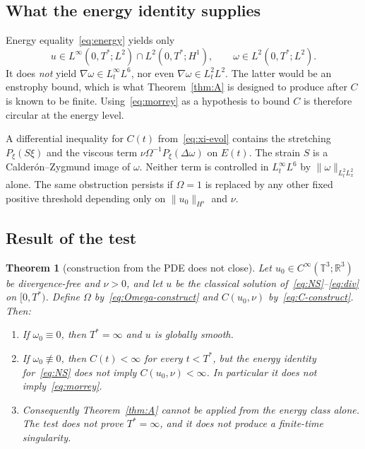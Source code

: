 \documentclass[11pt,a4paper]{article}
\newtheorem{theorem}{Theorem}
\theoremstyle{definition}
\theoremstyle{remark}
\newcommand{\R}{\mathbb{R}}
\newcommand{\T}{\mathbb{T}}
\newcommand{\norm}[1]{\lVert#1\rVert}
\begin{document}
\subsection{What the energy identity supplies}

Energy equality~\eqref{eq:energy} yields only
\[
u\in L^\infty(0,T^*;L^2)\cap L^2(0,T^*;H^1),
\qquad
\omega\in L^2(0,T^*;L^2).
\]
It does \emph{not} yield \(\nabla\omega\in L^\infty_t L^6\), nor even
\(\nabla\omega\in L^2_t L^2\). The latter would be an enstrophy bound,
which is what Theorem~\ref{thm:A} is designed to produce after \(C\) is
known to be finite. Using~\eqref{eq:morrey} as a hypothesis to bound \(C\)
is therefore circular at the energy level.

A differential inequality for \(C(t)\) from~\eqref{eq:xi-evol} contains
the stretching \(P_\xi(S\xi)\) and the viscous term
\(\nu\Omega^{-1}P_\xi(\Delta\omega)\) on \(E(t)\). The strain \(S\) is a
Calder\'on--Zygmund image of \(\omega\). Neither term is controlled in
\(L^\infty_t L^6\) by \(\norm{\omega}_{L^2_t L^2_x}\) alone. The same
obstruction persists if \(\Omega=1\) is replaced by any other fixed
positive threshold depending only on \(\norm{u_0}_{H^s}\) and \(\nu\).

\subsection{Result of the test}

\begin{theorem}[construction from the PDE does not close]
\label{thm:B}
Let \(u_0\in C^\infty(\T^3;\R^3)\) be divergence-free and \(\nu>0\), and
let \(u\) be the classical solution of~\eqref{eq:NS}--\eqref{eq:div} on
\([0,T^*)\). Define \(\Omega\) by~\eqref{eq:Omega-construct} and
\(C(u_0,\nu)\) by~\eqref{eq:C-construct}. Then:
\begin{enumerate}
\item If \(\omega_0\equiv 0\), then \(T^*=\infty\) and \(u\) is globally
smooth.
\item If \(\omega_0\not\equiv 0\), then \(C(t)<\infty\) for every
\(t<T^*\), but the energy identity for~\eqref{eq:NS} does not imply
\(C(u_0,\nu)<\infty\). In particular it does not imply~\eqref{eq:morrey}.
\item Consequently Theorem~\ref{thm:A} cannot be applied from the energy
class alone. The test does not prove \(T^*=\infty\), and it does not
produce a finite-time singularity.
\end{enumerate}
\end{theorem}
\end{document}
